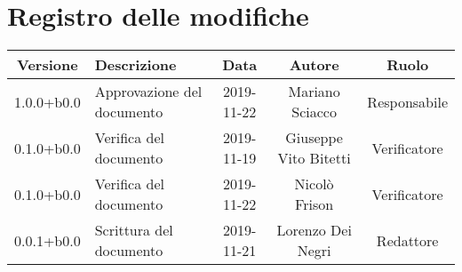 \section*{Registro delle modifiche}

\begin{center}
	\begin{longtable}{|c|p{3cm}|c|c|c|}
	\hline
	\rowcolor{lighter-grayer}
	\textbf{Versione} & \textbf{Descrizione} & \textbf{Data} & \textbf{Autore} & \textbf{Ruolo} \\
	\hline
	\endfirsthead


	1.0.0+b0.0 & Approvazione del documento & 2019-11-22 & Mariano Sciacco & Responsabile \\
	\hline
	0.1.0+b0.0 & Verifica del documento & 2019-11-19 & Giuseppe Vito Bitetti & Verificatore \\
	\hline
	0.1.0+b0.0 & Verifica del documento & 2019-11-22 & Nicolò Frison & Verificatore \\
	\hline
	0.0.1+b0.0 & Scrittura del documento & 2019-11-21 & Lorenzo Dei Negri & Redattore \\

	\hline

	\end{longtable}
\end{center}

